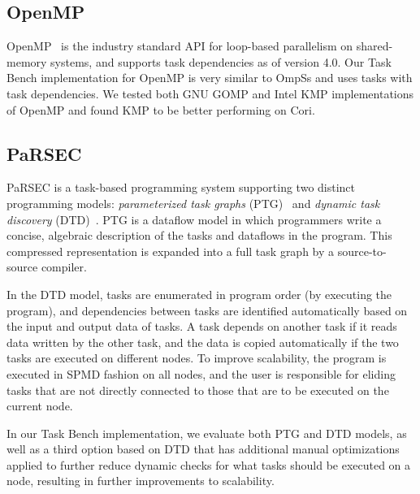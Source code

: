 
\subsection{OpenMP}

OpenMP~\cite{OpenMPSpec40} is the industry standard API for loop-based
parallelism on shared-memory systems, and supports task dependencies as of version 4.0. Our Task Bench implementation
for OpenMP is very similar to OmpSs and uses tasks with
task dependencies. We tested both GNU GOMP and Intel KMP
implementations of OpenMP and found KMP to be better performing on Cori.

\subsection{PaRSEC}

PaRSEC is a task-based programming system supporting two distinct
programming models: \emph{parameterized task graphs}
(PTG)~\cite{PARSEC13} and \emph{dynamic task discovery}
(DTD)~\cite{PARSEC_DTD}.  PTG is a dataflow model in which programmers
write a concise, algebraic description of the tasks and dataflows in
the program. This compressed representation is expanded into a full
task graph by a source-to-source compiler.

In the DTD model, tasks are enumerated in program order (by
executing the program), and dependencies between tasks are
identified automatically based on the input and output data of tasks. 
A task depends on another task if it reads data written by the other task,
and the data is copied automatically if the two tasks are executed on
different nodes. To
improve scalability, the program is executed in
SPMD fashion on all nodes, and the user is responsible for eliding
tasks that are not directly connected to those that are to be executed
on the current node.

In our Task Bench implementation, we evaluate both PTG and DTD models,
as well as a third option based on DTD that has additional manual
optimizations applied to further reduce dynamic checks for what tasks
should be executed on a node, resulting in further improvements to
scalability.


